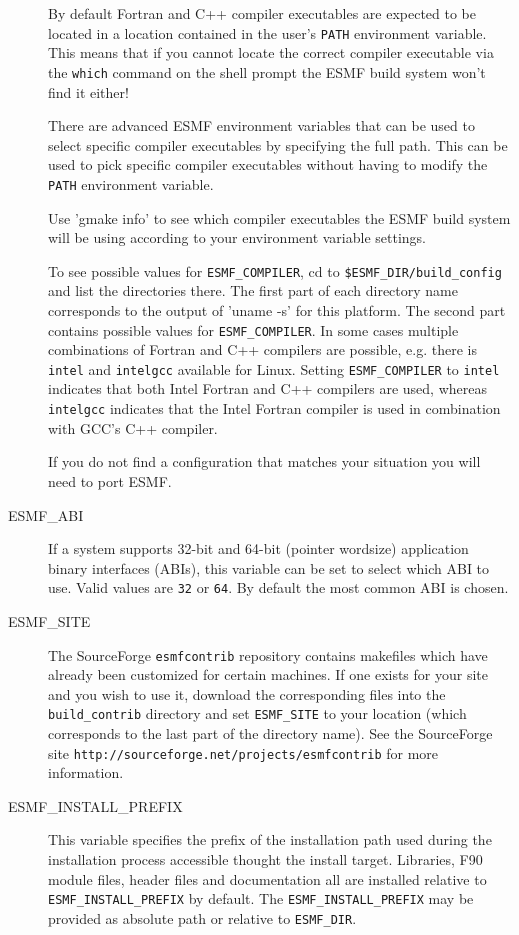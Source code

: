 \begin{description}
By default Fortran and C++ compiler executables are expected to be located in
a location contained in the user's {\tt PATH} environment variable. This means
that if you cannot locate the correct compiler executable via the {\tt which}
command on the shell prompt the ESMF build system won't find it either!

There are advanced ESMF environment variables that can be used to select 
specific compiler executables by specifying the full path. This can be used to
pick specific compiler executables without having to modify the {\tt PATH}
environment variable.

Use 'gmake info' to see which compiler executables the ESMF build system will
be using according to your environment variable settings.

To see possible values for {\tt ESMF\_COMPILER}, cd to 
{\tt \$ESMF\_DIR/build\_config} and list the directories there. The first part 
of each directory name corresponds to the output of 'uname -s' for this 
platform. The second part contains possible values for {\tt ESMF\_COMPILER}. In
some cases multiple combinations of Fortran and C++ compilers are possible, e.g.
there is {\tt intel} and {\tt intelgcc} available for Linux. Setting 
{\tt ESMF\_COMPILER} to {\tt intel} indicates that both Intel Fortran and 
C++ compilers are used, whereas {\tt intelgcc} indicates that the Intel Fortran
compiler is used in combination with GCC's C++ compiler.

If you do not find a configuration that matches your situation you will need to
port ESMF.

\item[ESMF\_ABI]
If a system supports 32-bit and 64-bit (pointer wordsize) application binary
interfaces (ABIs), this variable can be set to select which ABI to use. Valid 
values are {\tt 32} or {\tt 64}. By default the most common ABI is chosen.

\item[ESMF\_SITE]
The SourceForge {\tt esmfcontrib} repository contains makefiles which have 
already been customized for certain machines.  If one exists for your site 
and you wish to use it, download the corresponding files into the 
{\tt build\_contrib} directory and set {\tt ESMF\_SITE} to your location
(which corresponds to the last part of the directory name).  See the 
SourceForge site {\tt http://sourceforge.net/projects/esmfcontrib} for more 
information.

\item[ESMF\_INSTALL\_PREFIX]
This variable specifies the prefix of the installation path used during the
installation process accessible thought the install target. Libraries, F90
module files, header files and documentation all are installed relative to
{\tt ESMF\_INSTALL\_PREFIX} by default. The {\tt ESMF\_INSTALL\_PREFIX} may be
provided as absolute path or relative to {\tt ESMF\_DIR}.

\end{description}


